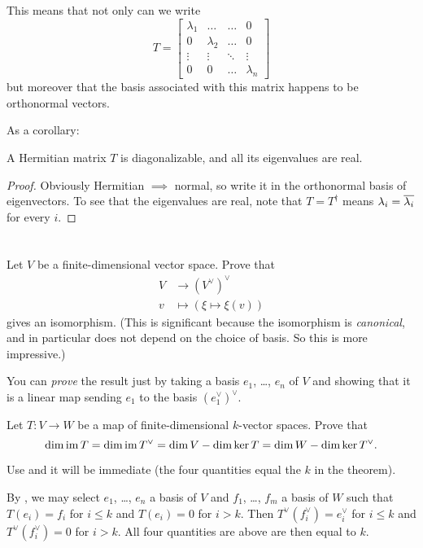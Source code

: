 This means that not only can we write
\[ T = \begin{bmatrix}
		\lambda_1 & \dots & \dots & 0 \\
		0 & \lambda_2 & \dots & 0 \\
		\vdots & \vdots & \ddots & \vdots \\
		0 & 0 & \dots & \lambda_n
	\end{bmatrix}
\]
but moreover that the basis associated with this matrix happens to be orthonormal vectors.

As a corollary:
\begin{theorem}
	A Hermitian matrix $T$ is diagonalizable,
	and all its eigenvalues are real.
\end{theorem}
\begin{proof}
	Obviously Hermitian $\implies$ normal,
	so write it in the orthonormal basis of eigenvectors.
	To see that the eigenvalues are real, note that $T = T^\dagger$
	means $\lambda_i = \overline{\lambda_i}$ for every $i$.
\end{proof}

\section{\problemhead}
\begin{sproblem}
	\gim
	\label{prob:double_dual}
	Let $V$ be a finite-dimensional vector space.
	Prove that
	\begin{align*}
		V &\to (V^\vee)^\vee \\
		v &\mapsto \left( \xi \mapsto \xi(v) \right)
	\end{align*}
	gives an isomorphism.
	(This is significant because the isomorphism is \emph{canonical},
	and in particular does not depend on the choice of basis.
	So this is more impressive.)
	\begin{hint}
		You can \emph{prove} the result just by taking a basis
		$e_1$, \dots, $e_n$ of $V$
		and showing that it is a linear map sending $e_1$
		to the basis $(e_1^\vee)^\vee$.
	\end{hint}
\end{sproblem}

\begin{problem}
	Let $T \colon V \to W$ be a map of finite-dimensional $k$-vector spaces.
	Prove that
	\[ \dim \operatorname{im} T = \dim \operatorname{im} T^\vee
		= \dim V - \dim \ker T = \dim W - \dim \ker T^\vee. \]
	\begin{hint}
		Use  and it will be immediate
		(the four quantities equal the $k$ in the theorem).
	\end{hint}
	\begin{sol}
		By ,
		we may select $e_1$, \dots, $e_n$ a basis of $V$
		and $f_1$, \dots, $f_m$ a basis of $W$
		such that $T(e_i) = f_i$ for $i \le k$
		and $T(e_i) = 0$ for $i > k$.
		Then $T^\vee(f_i^\vee) = e_i^\vee$ for $i \le k$
		and $T^\vee(f_i^\vee) = 0$ for $i > k$.
		All four quantities are above are then equal to $k$.
	\end{sol}
\end{problem}

